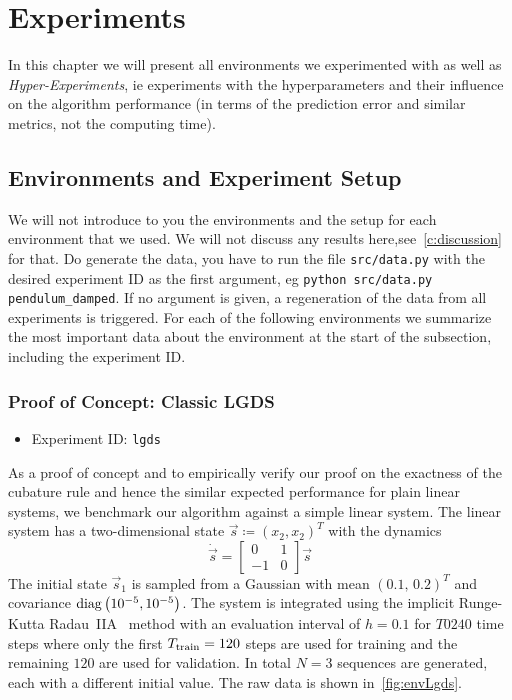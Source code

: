 \chapter{Experiments}
\label{c:experiments}



In this chapter we will present all environments we experimented with as well as \emph{Hyper-Experiments}, \ac{ie} experiments with the hyperparameters and their influence on the algorithm performance (in terms of the prediction error and similar metrics, not the computing time).

\section{Environments and Experiment Setup}
	We will not introduce to you the environments and the setup for each environment that we used. We will not discuss any results here,see~\autoref{c:discussion} for that. Do generate the data, you have to run the file \texttt{src/data.py} with the desired experiment ID as the first argument, \ac{eg} \texttt{python src/data.py pendulum\_damped}. If no argument is given, a regeneration of the data from all experiments is triggered. For each of the following environments we summarize the most important data about the environment at the start of the subsection, including the experiment ID.

	\subsection{Proof of Concept: Classic LGDS}
		\begin{itemize}
			\item Experiment ID: \texttt{lgds}
		\end{itemize}

		As a proof of concept and to empirically verify our proof on the exactness of the cubature rule and hence the similar expected performance for plain linear systems, we benchmark our algorithm against a simple linear system. The linear system has a two-dimensional state \( \vec{s} \coloneqq (x_2, x_2)^T \) with the dynamics
		\begin{equation*}
			\dot{\vec{s}} =
				\begin{bmatrix}
					 0 & 1 \\
					-1 & 0
				\end{bmatrix} \vec{s}
		\end{equation*}
		The initial state \( \vec{s}_1 \) is sampled from a Gaussian with mean \( (0.1,\, 0.2)^T \) and covariance \( \operatorname{diag}\big(10^{-5}, 10^{-5}\big) \). The system is integrated using the implicit Runge-Kutta Radau~IIA~\cite{guglielmiImplementingRadauIIA2001} method with an evaluation interval of \( h = 0.1 \) for \(T 0 240\) time steps where only the first \(T_{\mathrm{train}} = 120\) steps are used for training and the remaining \(120\) are used for validation. In total \(N = 3\) sequences are generated, each with a different initial value. The raw data is shown in~\autoref{fig:envLgds}.

